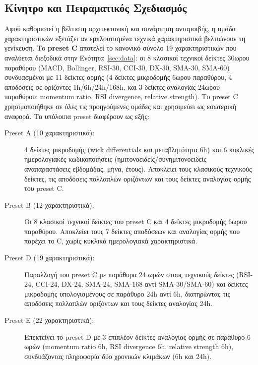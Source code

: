 \subsection{Κίνητρο και Πειραματικός Σχεδιασμός}
\label{subsec:exp-features-design}

Αφού καθοριστεί η βέλτιστη αρχιτεκτονική και συνάρτηση ανταμοιβής, η ομάδα χαρακτηριστικών εξετάζει
αν εμπλουτισμένα τεχνικά χαρακτηριστικά βελτιώνουν τη γενίκευση. Το \textbf{preset C} αποτελεί το
κανονικό σύνολο 19 χαρακτηριστικών που αναλύεται διεξοδικά στην Ενότητα~\ref{sec:data}: οι 8
κλασικοί τεχνικοί δείκτες 30ωρου παραθύρου (MACD, Bollinger, RSI-30, CCI-30, DX-30, SMA-30,
SMA-60) συνδυασμένοι με 11 δείκτες ορμής (4 δείκτες μικροδομής 6ωρου παραθύρου, 4 αποδόσεις σε
ορίζοντες 1h/6h/24h/168h, και 3 δείκτες αναλογίας 24ωρου παραθύρου: momentum ratio, RSI
divergence, relative strength). Το preset C χρησιμοποιήθηκε σε όλες τις προηγούμενες ομάδες και
χρησιμεύει ως εσωτερική αναφορά. Τα υπόλοιπα preset διαφέρουν ως εξής:

\begin{description}
  \item[Preset A (10 χαρακτηριστικά):] 4 δείκτες μικροδομής (wick differentials και μεταβλητότητα
    6h) και 6 κυκλικές ημερολογιακές κωδικοποιήσεις (ημιτονοειδείς/συνημιτονοειδείς
    αναπαραστάσεις εβδομάδας, μήνα, έτους). Αποκλείει τους κλασικούς τεχνικούς δείκτες, τις
    αποδόσεις πολλαπλών οριζόντων και τους δείκτες αναλογίας ορμής του preset C.

  \item[Preset B (12 χαρακτηριστικά):] Οι 8 κλασικοί τεχνικοί δείκτες του preset C και 4
    δείκτες μικροδομής 6ωρου παραθύρου. Αποκλείει τους 7 δείκτες αποδόσεων και αναλογίας
    ορμής που παρέχει το C, χωρίς κυκλικά ημερολογιακά χαρακτηριστικά.

  \item[Preset D (19 χαρακτηριστικά):] Παραλλαγή του preset C με παράθυρα 24 ωρών στους
    τεχνικούς δείκτες (RSI-24, CCI-24, DX-24, SMA-24, SMA-168 αντί SMA-30/SMA-60) και
    δείκτες μικροδομής υπολογισμένους σε παράθυρο 24h αντί 6h, διατηρώντας τις αποδόσεις
    πολλαπλών οριζόντων και τους δείκτες αναλογίας 24h.

  \item[Preset E (22 χαρακτηριστικά):] Επεκτείνει το preset D με 3 επιπλέον δείκτες
    αναλογίας ορμής σε παράθυρο 6 ωρών (momentum ratio 6h, RSI divergence 6h, relative
    strength 6h), συνδυάζοντας πληροφορία δύο χρονικών κλιμάκων (6h και 24h).
\end{description}

